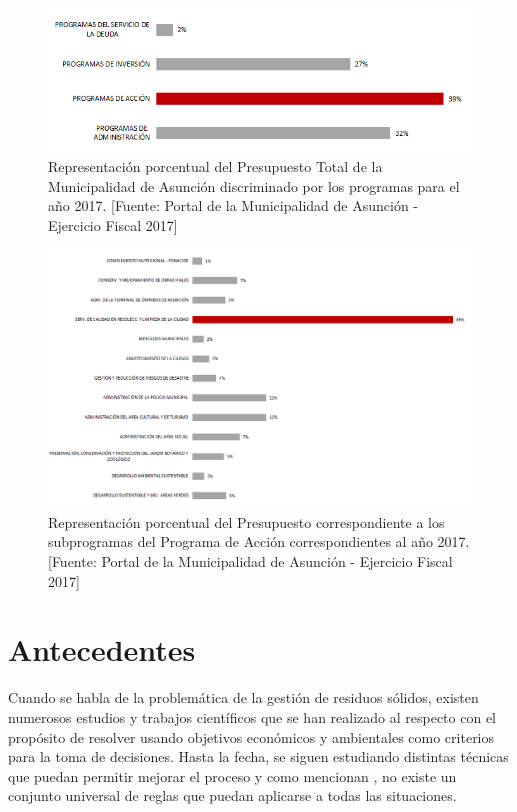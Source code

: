 \begin{figure}[H]
    \centering
    \includegraphics[width=14.5cm]{20181119_PresupuestoTotal2017.png}
    \caption{Representación porcentual del Presupuesto Total de la Municipalidad de Asunción discriminado por los programas para el año 2017. [Fuente: Portal de la Municipalidad de Asunción - Ejercicio Fiscal 2017]}
    \label{fig:porcentajePresupuesto}
\end{figure}

\begin{figure}[H]
    \centering
    \includegraphics[width=15cm]{20181119_PresupuestoAccion2017.png}
    \caption{ Representación porcentual del Presupuesto correspondiente a los subprogramas del Programa de Acción correspondientes al año 2017. [Fuente: Portal de la Municipalidad de Asunción - Ejercicio Fiscal 2017]}
    \label{fig:programaAccion}
\end{figure}

\section{Antecedentes}

Cuando se habla de la problemática de la gestión de residuos sólidos, existen numerosos estudios y trabajos científicos que se han realizado al respecto con el propósito de resolver usando objetivos económicos y ambientales como criterios para la toma de decisiones. Hasta la fecha, se siguen estudiando distintas técnicas que puedan permitir mejorar el proceso y como mencionan \citet{Tchobanoglous1993IntegratedIssues}, no existe un conjunto universal de reglas que puedan aplicarse a todas las situaciones.

